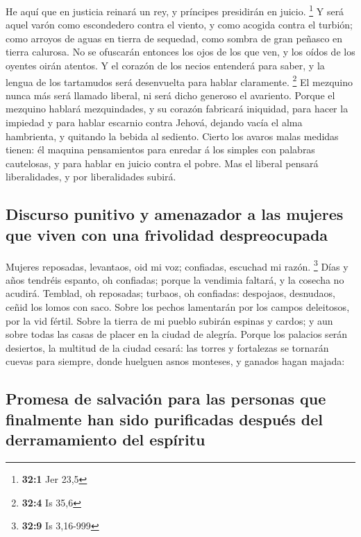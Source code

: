  He aquí que en justicia reinará un rey, y príncipes
presidirán en juicio. \footnote{\textbf{32:1} Jer 23,5}  Y
será aquel varón como escondedero contra el viento, y como acogida
contra el turbión; como arroyos de aguas en tierra de sequedad, como
sombra de gran peñasco en tierra calurosa.  No se
ofuscarán entonces los ojos de los que ven, y los oídos de los oyentes
oirán atentos.  Y el corazón de los necios entenderá para
saber, y la lengua de los tartamudos será desenvuelta para hablar
claramente. \footnote{\textbf{32:4} Is 35,6}  El mezquino
nunca más será llamado liberal, ni será dicho generoso el avariento.
 Porque el mezquino hablará mezquindades, y su corazón
fabricará iniquidad, para hacer la impiedad y para hablar escarnio
contra Jehová, dejando vacía el alma hambrienta, y quitando la bebida al
sediento.  Cierto los avaros malas medidas tienen: él
maquina pensamientos para enredar á los simples con palabras cautelosas,
y para hablar en juicio contra el pobre.  Mas el liberal
pensará liberalidades, y por liberalidades subirá.

\hypertarget{discurso-punitivo-y-amenazador-a-las-mujeres-que-viven-con-una-frivolidad-despreocupada}{%
\subsection{Discurso punitivo y amenazador a las mujeres que viven con
una frivolidad
despreocupada}\label{discurso-punitivo-y-amenazador-a-las-mujeres-que-viven-con-una-frivolidad-despreocupada}}

 Mujeres reposadas, levantaos, oid mi voz; confiadas,
escuchad mi razón. \footnote{\textbf{32:9} Is 3,16-999} 
Días y años tendréis espanto, oh confiadas; porque la vendimia faltará,
y la cosecha no acudirá.  Temblad, oh reposadas; turbaos,
oh confiadas: despojaos, desnudaos, ceñid los lomos con saco.
 Sobre los pechos lamentarán por los campos deleitosos,
por la vid fértil.  Sobre la tierra de mi pueblo subirán
espinas y cardos; y aun sobre todas las casas de placer en la ciudad de
alegría.  Porque los palacios serán desiertos, la
multitud de la ciudad cesará: las torres y fortalezas se tornarán cuevas
para siempre, donde huelguen asnos monteses, y ganados hagan majada:

\hypertarget{promesa-de-salvaciuxf3n-para-las-personas-que-finalmente-han-sido-purificadas-despuuxe9s-del-derramamiento-del-espuxedritu}{%
\subsection{Promesa de salvación para las personas que finalmente han
sido purificadas después del derramamiento del
espíritu}\label{promesa-de-salvaciuxf3n-para-las-personas-que-finalmente-han-sido-purificadas-despuuxe9s-del-derramamiento-del-espuxedritu}}

